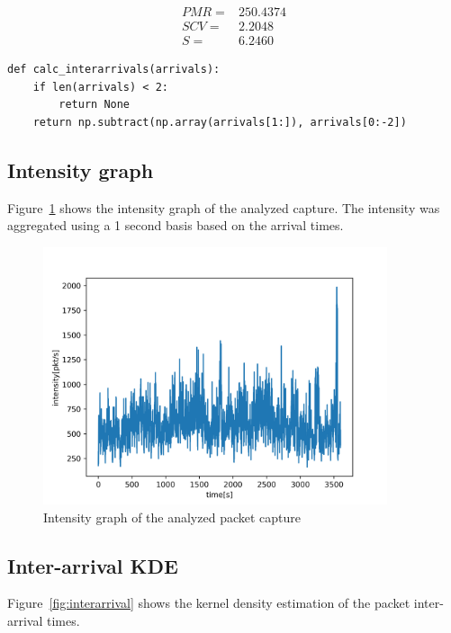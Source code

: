 \documentclass[a4paper]{article}
\begin{document}
 \begin{align*} 
& PMR = & 250.4374 & \\
& SCV = & 2.2048  & \\
& S   = & 6.2460 &
\end{align*} 

 
\begin{lstlisting}[style=mypython,caption={The functions used for calculating IDI and IDC},label={lst:interarr}]
def calc_interarrivals(arrivals):
    if len(arrivals) < 2:
        return None
    return np.subtract(np.array(arrivals[1:]), arrivals[0:-2])
\end{lstlisting}


\subsection{Intensity graph}

Figure~\ref{fig:intensity} shows the intensity graph of the analyzed capture. The intensity was aggregated using a 1 second basis based on the arrival times.

\begin{figure}[H]
    \centering
    \includegraphics[width=0.9\textwidth]{figures/intensity.png}
    \caption{Intensity graph of the analyzed packet capture}
    \label{fig:intensity}
\end{figure}

\subsection{Inter-arrival KDE}

Figure~\ref{fig:interarrival} shows the kernel density estimation of the packet inter-arrival times.
\end{document}
